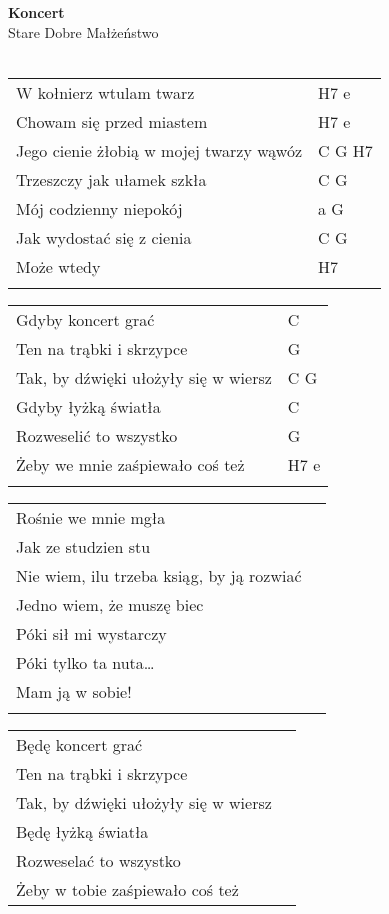 \documentclass[a5paper]{article}
\begin{document}


\noindent
\fontsize{12pt}{15pt}\selectfont
\textbf{Koncert} \\
\fontsize{8pt}{10pt}\selectfont
Stare Dobre Małżeństwo \\ \\
\fontsize{10pt}{12pt}\selectfont
{}
\begin{tabular}{@{}p{8.50cm}p{3cm}@{}}
\noindent
W kołnierz wtulam twarz & H7 e \\
Chowam się przed miastem & H7 e \\
Jego cienie żłobią w mojej twarzy wąwóz & C G H7 \\
Trzeszczy jak ułamek szkła & C G \\
Mój codzienny niepokój & a G \\
Jak wydostać się z cienia & C G \\
Może wtedy & H7 \\ \\
\end{tabular}

\noindent
\begin{tabular}{@{}p{7.50cm}p{3cm}@{}}
Gdyby koncert grać & C \\
Ten na trąbki i skrzypce & G \\
Tak, by dźwięki ułożyły się w wiersz & C G \\
Gdyby łyżką światła & C \\
Rozweselić to wszystko & G \\
Żeby we mnie zaśpiewało coś też & H7 e \\ \\
\end{tabular}

\noindent
\begin{tabular}{@{}p{7.50cm}p{3cm}@{}}
Rośnie we mnie mgła \\
Jak ze studzien stu \\
Nie wiem, ilu trzeba ksiąg, by ją rozwiać \\
Jedno wiem, że muszę biec \\
Póki sił mi wystarczy \\
Póki tylko ta nuta… \\
Mam ją w sobie! \\ \\
\end{tabular}

\noindent
\begin{tabular}{@{}p{7.50cm}p{3cm}@{}}
Będę koncert grać \\
Ten na trąbki i skrzypce \\
Tak, by dźwięki ułożyły się w wiersz \\
Będę łyżką światła \\
Rozweselać to wszystko \\
Żeby w tobie zaśpiewało coś też 
\end{tabular}
\end{document}
